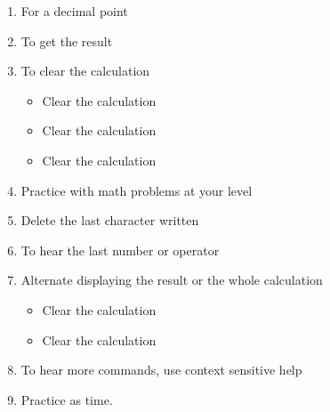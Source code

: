 \documentclass[10pt,letterpaper,twoside]{report}
\begin{document}
{\begin{enumerate}
\begin{enumerate}
		      \item For a decimal point 
		      \item To get the result 
		      \item To clear the calculation
		            \begin{itemize}
			            \item Clear the calculation 
			            \item  Clear the calculation
			            \item Clear the calculation
		            \end{itemize}
		      \item Practice with math problems at your level
		      \item Delete the last character written 
		      \item To hear the last number or operator 
		      \item Alternate displaying the result or the whole calculation
		            \begin{itemize}
			            \item Clear the calculation 
			            \item Clear the calculation 
		            \end{itemize}
		      \item To hear more commands, use context sensitive help 
		      \item Practice as time.
	      \end{enumerate}
\end{enumerate}

}
\end{document}
